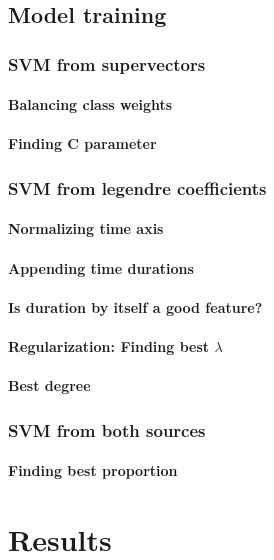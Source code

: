 \documentclass[11pt,a4paper]{tesis}
\begin{document}
	\section{Model training}
		\subsection{SVM from supervectors}
			\subsubsection{Balancing class weights}
			\subsubsection{Finding C parameter}
		\subsection{SVM from legendre coefficients}
			\subsubsection{Normalizing time axis}
			\subsubsection{Appending time durations}
			\subsubsection{Is duration by itself a good feature?}
			\subsubsection{Regularization: Finding best $\lambda$}
			\subsubsection{Best degree}
		\subsection{SVM from both sources}
			\subsubsection{Finding best proportion}

\chapter{Results}
\end{document}
